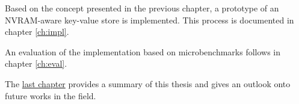 Based on the concept presented in the previous chapter, a prototype of an
NVRAM-aware key-value store is implemented. This process is documented in
chapter \ref{ch:impl}.

An evaluation of the implementation based on microbenchmarks follows in chapter
\ref{ch:eval}.

The \hyperref[ch:summary]{last chapter} provides a summary of this thesis and
gives an outlook onto future works in the field.
